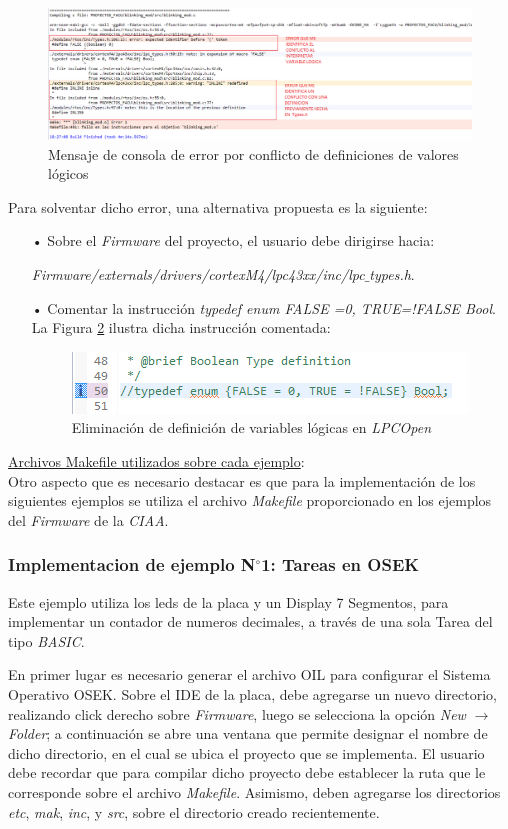 \documentclass[12pt,letterpaper]{article}
\begin{document}
\begin{figure}[!h]
\centering
\includegraphics[width=16 cm]{figuras/f24.png}
\caption{Mensaje de consola de error por conflicto de definiciones de valores lógicos}
\label{errorboolean}
\end{figure}
Para solventar dicho error, una alternativa propuesta es la siguiente:
\begin{enumerate}
\item[•]Sobre el \textit{Firmware} del proyecto, el usuario debe dirigirse hacia:

{\footnotesize \textit{Firmware/externals/drivers/cortexM4/lpc43xx/inc/lpc$\_$types.h}}.
\item[•]Comentar la instrucción \textit{typedef enum {FALSE =0, TRUE=!FALSE} Bool}. La Figura \ref{eliminacion} ilustra dicha instrucción comentada:
\begin{figure}[!h]
\centering
\includegraphics[width=8 cm]{figuras/f25.png}
\caption{Eliminación de definición de variables lógicas en \textit{LPCOpen}}
\label{eliminacion}
\end{figure}
\end{enumerate}\underline{Archivos Makefile utilizados sobre cada ejemplo}: \\
Otro aspecto que es necesario destacar es que para la implementación de los siguientes ejemplos se utiliza el archivo \textit{Makefile} proporcionado en los ejemplos del \textit{Firmware} de la \textit{CIAA}.
\subsubsection{Implementacion de ejemplo N$^{\circ}$1: Tareas en OSEK}\label{sec:tareasOSEK}
Este ejemplo utiliza los leds de la placa y un Display 7 Segmentos, para implementar un contador de numeros decimales, a través de una sola Tarea del tipo \textit{BASIC}.

En primer lugar es necesario generar el archivo OIL para configurar el Sistema Operativo OSEK. Sobre el IDE de la placa, debe agregarse un nuevo directorio, realizando click derecho sobre \textit{Firmware}, luego se selecciona la opción \textit{New} $\rightarrow$ \textit{Folder}; a continuación se abre una ventana que permite designar el nombre de dicho directorio, en el cual se ubica el proyecto que se implementa. El usuario debe recordar que para compilar dicho proyecto debe establecer la ruta que le corresponde sobre el archivo \textit{Makefile}. Asimismo, deben agregarse los directorios \textit{etc}, \textit{mak}, \textit{inc}, y \textit{src}, sobre el directorio creado recientemente.
\end{document}
